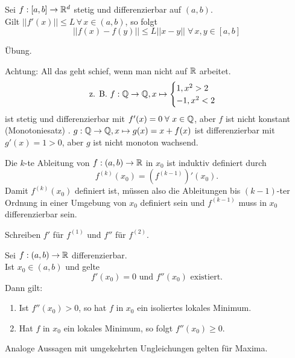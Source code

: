 \documentclass[../ana1.tex]{subfiles}
\begin{document}
\begin{kor}
    Sei \( f: [a,b] \rightarrow \mathbb{R}^d \) stetig und 
    differenzierbar auf \( (a,b) \). \\
    Gilt \( ||f'(x)|| \leq L \, \forall \, x \in (a,b) \), 
    so folgt 
    \[ ||f(x) - f(y)|| \leq L ||x-y|| 
    \; \forall \, x,y \in [a,b] \]
\end{kor}
\begin{bew}
    Übung.
\end{bew}
\begin{prosa}
    Achtung: All das geht schief, wenn man nicht auf 
    \( \mathbb{R} \) arbeitet.
    \[ \text{z. B. } f: \mathbb{Q} \rightarrow \mathbb{Q}, x \mapsto 
    \begin{cases}
        1, x^2 > 2\\
        -1, x^2 < 2
    \end{cases} \]
    ist stetig und differenzierbar mit 
    \( f'(x) = 0 \; \forall \, x \in \Q \), aber 
    \( f \) ist nicht konstant (Monotoniesatz) \Lightning{}.
    \( g: \mathbb{Q} \rightarrow \mathbb{Q}, x \mapsto g(x) = x + f(x) \) 
    ist differenzierbar mit \( g'(x) = 1 > 0 \), aber 
    \( g \) ist nicht monoton wachsend.
\end{prosa}
\begin{defi}
    Die \( k \)-te Ableitung von 
    \( f: (a,b) \rightarrow \mathbb{R} \) in \( x_0 \) ist 
    induktiv definiert durch 
    \[ f^{(k)}(x_0) = (f^{(k-1)})'(x_0). \]
    Damit \( f^{(k)}(x_0) \) definiert ist, müssen 
    also die Ableitungen bis \( (k-1) \)-ter Ordnung 
    in einer Umgebung von \( x_0 \) definiert sein und 
    \( f^{(k-1)} \) muss in \( x_0 \) differenzierbar sein.
\end{defi}
\begin{notation}
    Schreiben \( f' \) für \( f^{(1)} \) und \( f'' \) 
    für \( f^{(2)} \).
\end{notation}
\begin{satz}
    Sei \( f: (a,b) \rightarrow \mathbb{R} \) differenzierbar. \\
    Ist \( x_0 \in (a,b) \) und gelte 
    \[ f'(x_0) = 0 \text{ und } f''(x_0) \text{ existiert.} \]
    Dann gilt:
    \begin{enumerate}
        \item Ist \( f''(x_0) > 0 \), so hat \( f \) in 
        \( x_0 \) ein isoliertes lokales Minimum.
        \item Hat \( f \) in \( x_0 \) ein lokales 
        Minimum, so folgt \( f''(x_0) \geq 0 \).
    \end{enumerate}
    Analoge Aussagen mit umgekehrten Ungleichungen gelten 
    für Maxima.
\end{satz}
\end{document}
